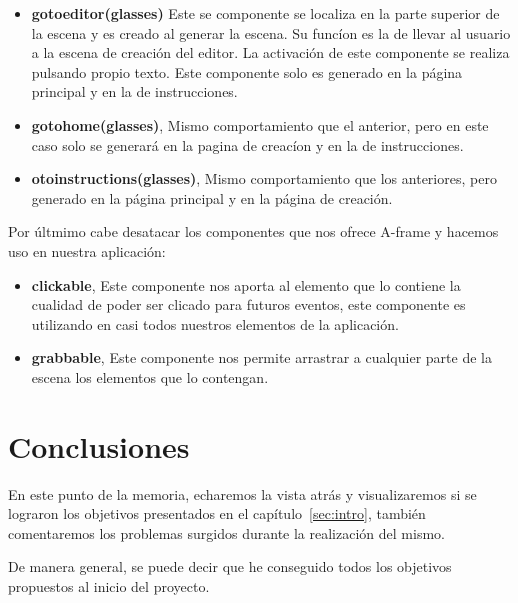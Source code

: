 \documentclass[a4paper, 12pt]{book}
\begin{document}
\begin{itemize}
    \item \textbf{gotoeditor(glasses)} Este se componente se localiza en la parte superior de la escena y es creado al generar la escena. Su funcíon es la de llevar al usuario a la escena de creación del editor. La activación de este componente se realiza pulsando propio texto. Este componente solo es generado en la página principal y en la de instrucciones.
    

    \item \textbf{gotohome(glasses)}, Mismo comportamiento que el anterior, pero en este caso solo se generará en la pagina de creacíon y en la de instrucciones.
    
    \item \textbf{otoinstructions(glasses)}, Mismo comportamiento que los anteriores, pero generado en la página principal y en la página de creación.
\end{itemize}

Por últmimo cabe desatacar los componentes que nos ofrece A-frame y hacemos uso en nuestra aplicación:
\begin{itemize}
    \item \textbf{clickable}, Este componente nos aporta al elemento que lo contiene la cualidad de poder ser clicado para futuros eventos, este componente es utilizando en casi todos nuestros elementos de la aplicación.
    \item \textbf{grabbable}, Este componente nos permite arrastrar a cualquier parte de la escena los elementos que lo contengan. 
\end{itemize}


\cleardoublepage
\chapter{Conclusiones}
\label{chap:conclusiones}
En este punto de la memoria, echaremos la vista atrás y visualizaremos si se lograron los objetivos presentados en el capítulo~\ref{sec:intro}, también comentaremos los problemas surgidos durante la realización del mismo.

De manera general, se puede decir que he conseguido todos los objetivos propuestos al inicio del proyecto.
\end{document}
